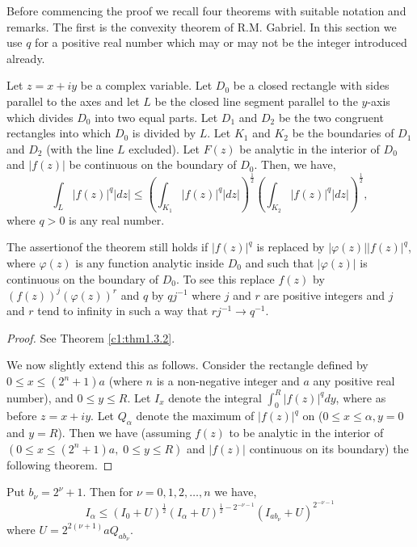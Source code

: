 \bigskip

\medskip
{} Before commencing the proof we recall four theorems with suitable notation and remarks. The first is the convexity theorem of R.M. Gabriel. In this section we use $q$ for a positive real number which may or may not be the integer introduced already.

\begin{theorem}\label{c4:thm4.2.2}
Let $z = x + iy$ be a complex variable. Let $D_0$ be a closed rectangle with sides parallel to the axes and let $L$ be the closed line segment parallel to the $y$-axis which divides $D_0$ into two equal parts. Let $D_1$ and $D_2$ be the two congruent rectangles into which $D_0$ is divided by $L$. Let $K_1$ and $K_2$ be the boundaries of $D_1$ and $D_2$ (with the line $L$ excluded). Let $F(z)$ be analytic in the interior of $D_0$ and $|f(z)|$ be continuous on the boundary of $D_0$. Then, we have,
$$
\int_L |f(z)|^q |dz| \leq \left(\int_{K_1} |f(z)|^q |dz|\right)^{\frac{1}{2}} \left( \int_{K_2} |f(z)|^q |dz| \right)^{\frac{1}{2}},
$$
where $q >0$ is any real number.
\end{theorem}

\begin{remark*}
The assertion\pageoriginale of the theorem still holds if $|f(z)|^q$ is replaced by $|\varphi(z) || f(z)|^q$, where $\varphi(z)$ is any function analytic inside $D_0$ and such that $|\varphi (z)|$ is continuous on the boundary of $D_0$. To see this replace $f(z)$ by $(f(z))^j (\varphi(z))^r$ and $q$ by $qj^{-1}$ where $j$ and $r$ are positive integers and $j$ and $r$ tend to infinity in such a way that $rj^{-1} \to q^{-1}$. 
\end{remark*}

\begin{proof}
See Theorem \ref{c1:thm1.3.2}.

We now slightly extend this as follows. Consider the rectangle defined by $0 \leq x \leq (2^n +1) a$  (where $n$ is a non-negative integer and $a$ any positive real number), and $0\leq y \leq R$. Let $I_x$ denote the integral $\int^R_0 |f(z)|^q  dy$, where as before $z=x+ iy$. Let $Q_\alpha$ denote the maximum of $|f(z)|^q$ on ($0\leq x \leq \alpha, y =0$ and $y=R$). Then we have (assuming $f(z)$ to be analytic in the interior of $(0\leq x \leq (2^n + 1)a, \; 0 \leq y \leq R)$ and $|f(z)|$ continuous on its boundary) the following theorem.
\end{proof}

\begin{theorem}\label{c4:thm4.2.3}
Put $b_\nu = 2^\nu + 1$. Then for $\nu =0 , 1,2,\ldots , n$ we have, 
$$
I_\alpha \leq (I_0 + U)^{\frac{1}{2}} (I_\alpha + U)^{\frac{1}{2} - 2^{-\nu-1}} (I_{ab_\nu} + U)^{2^{-\nu-1}}
$$
where $U = 2^{2(\nu+1)} aQ_{ab_\nu}$.
\end{theorem}

